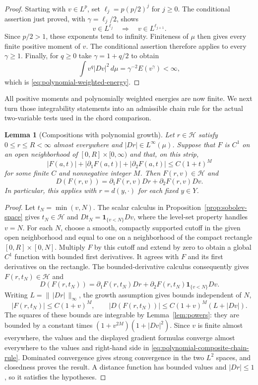 \documentclass[11pt]{article}
\numberwithin{equation}{section}
\newtheorem{lemma}[theorem]{Lemma}
\theoremstyle{definition}
\theoremstyle{remark}
\begin{document}
\begin{proof}
Starting with $v\in L^p$, set $\ell_j=p(p/2)^j$ for $j\ge0$.
The conditional assertion just proved, with $\gamma=\ell_j/2$, shows
\[
 v\in L^{\ell_j}\quad\Longrightarrow\quad v\in L^{\ell_{j+1}}.
\]
Since $p/2>1$, these exponents tend to infinity.  Finiteness of $\mu$ then gives
every finite positive moment of $v$.  The conditional assertion
therefore applies to every $\gamma\ge1$.  Finally, for $q\ge0$
take $\gamma=1+q/2$ to obtain
\[
 \int v^q|Dv|^2\,d\mu=\gamma^{-2}E(v^\gamma)<\infty,
\]
which is \eqref{eq:polynomial-weighted-energy}.
\end{proof}

All positive moments and polynomially weighted energies are now
finite. We next turn those integrability statements into an admissible
chain rule for the actual two-variable tests used in the chord
comparison.

\begin{lemma}[Compositions with polynomial growth]
\label{lem:composites}
Let $r\in\mathcal H$ satisfy $0\le r\le R<\infty$ almost everywhere and
$|Dr|\in L^\infty(\mu)$.  Suppose that $F$ is $C^1$ on an open
neighborhood of $[0,R]\times[0,\infty)$ and that, on this strip,
\[
 |F(a,t)|+|\partial_1F(a,t)|+|\partial_2F(a,t)|
 \le C(1+t)^M
\]
for some finite $C$ and nonnegative integer $M$.  Then
$F(r,v)\in\mathcal H$ and
\begin{equation}
 D(F(r,v))=\partial_1F(r,v)Dr+\partial_2F(r,v)Dv.
 \label{eq:polynomial-composite-chain-rule}
\end{equation}
In particular, this applies with $r=d(y,\cdot)$ for each fixed
$y\in Y$.
\end{lemma}

\begin{proof}
Let $t_N=\min(v,N)$.  The scalar calculus in
Proposition~\ref{prop:sobolev-space} gives $t_N\in\mathcal H$ and
$Dt_N=\mathbf1_{\{v<N\}}Dv$, where the level-set property handles
$v=N$.  For each $N$, choose a smooth, compactly supported cutoff in the given
open neighborhood and equal to one on a neighborhood of the compact
rectangle $[0,R]\times[0,N]$.  Multiply $F$ by this cutoff and extend
by zero to obtain a global $C^1$ function with bounded first
derivatives.  It agrees with $F$ and its first derivatives on the
rectangle.  The bounded-derivative calculus consequently gives
$F(r,t_N)\in\mathcal H$ and
\[
 D(F(r,t_N))
 =\partial_1F(r,t_N)Dr
  +\partial_2F(r,t_N)\mathbf1_{\{v<N\}}Dv.
\]
Writing $L=\|\,|Dr|\,\|_\infty$, the growth assumption gives bounds
independent of $N$,
\[
 |F(r,t_N)|\le C(1+v)^M,\qquad
 |D(F(r,t_N))|\le C(1+v)^M(L+|Dv|).
\]
The squares of these bounds are integrable by
Lemma~\ref{lem:powers}: they are bounded by a constant times
$(1+v^{2M})(1+|Dv|^2)$.  Since $v$ is finite almost everywhere,
the values and the displayed gradient formulas converge almost
everywhere to the values and right-hand side in
\eqref{eq:polynomial-composite-chain-rule}.  Dominated convergence
gives strong convergence in the two $L^2$ spaces, and closedness
proves the result.  A distance function has bounded values and
$|Dr|\le1$, so it satisfies the hypotheses.
\end{proof}
\end{document}
